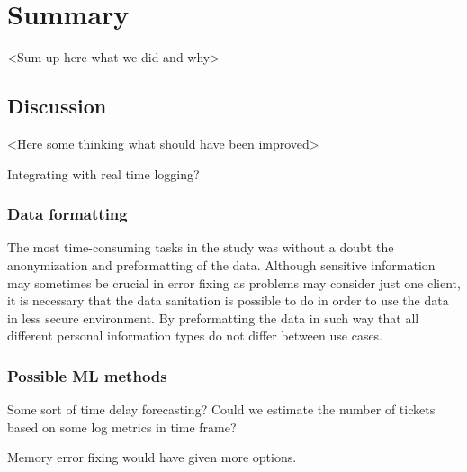 
\section{Summary}\label{sec:summary}

<Sum up here what we did and why>

\subsection{Discussion}\label{subsec:discussion}
<Here some thinking what should have been improved>

Integrating with real time logging?

\subsubsection*{Data formatting}
The most time-consuming tasks in the study
was without a doubt
the anonymization and preformatting of the data.
Although sensitive information may sometimes be crucial in error fixing
as problems may consider just one client,
it is necessary that the data sanitation is possible to do
in order to use the data in less secure environment.
By preformatting the data in such way
that all different personal information types
do not differ between use cases.


\subsubsection*{Possible ML methods}
Some sort of time delay forecasting?\cite{erharter2021pointlessness}
Could we estimate the number of tickets
based on some log metrics in time frame?

Memory error fixing would have given more options.




\clearpage